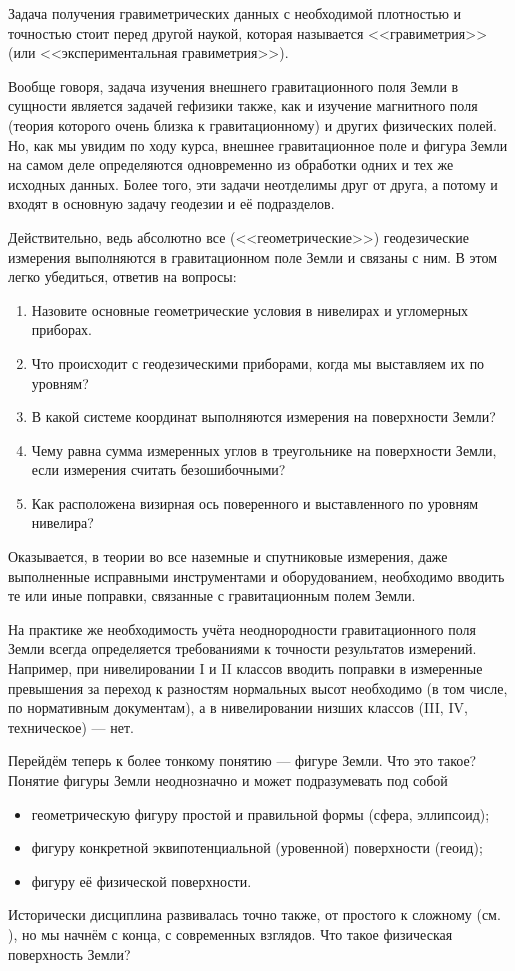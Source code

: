 \documentclass[11pt, a4paper]{article}
\theoremstyle{plain}
\theoremstyle{definition}
\theoremstyle{remark}
\begin{document}
Задача получения гравиметрических данных с необходимой плотностью и точностью стоит 
перед другой наукой, которая называется <<гравиметрия>> (или <<экспериментальная гравиметрия>>).

Вообще говоря, задача изучения внешнего гравитационного поля Земли в сущности является задачей
гефизики также, как и изучение магнитного поля (теория которого очень близка к гравитационному) 
и других физических полей. Но, как мы увидим по ходу курса, внешнее гравитационное поле и фигура
Земли на самом деле определяются одновременно из обработки одних и тех же исходных данных. Более
того, эти задачи неотделимы друг от друга, а потому и входят в основную задачу геодезии и её подразделов\cite{Pellinen1978}.

Действительно, ведь абсолютно все (<<геометрические>>) геодезические измерения выполняются в гравитационном поле 
Земли и связаны с ним. В этом легко убедиться, ответив на вопросы:
\begin{enumerate}
    \item Назовите основные геометрические условия в нивелирах и угломерных приборах.
    \item Что происходит с геодезическими приборами, когда мы выставляем их по уровням? 
    \item В какой системе координат выполняются измерения на поверхности Земли?
    \item Чему равна сумма измеренных углов в треугольнике на поверхности Земли, если измерения считать безошибочными?
    \item Как расположена визирная ось поверенного и выставленного по уровням нивелира?
\end{enumerate}
Оказывается, в теории во все наземные и спутниковые измерения, даже выполненные исправными
инструментами и оборудованием, необходимо вводить те или иные поправки, связанные с гравитационным полем Земли.

На практике же необходимость учёта неоднородности гравитационного поля Земли всегда определяется требованиями к
точности результатов измерений. Например, при нивелировании I и II классов вводить поправки в измеренные
превышения за переход к разностям нормальных высот необходимо (в том числе, по нормативным документам), а в 
нивелировании низших классов (III, IV, техническое) --- нет.

Перейдём теперь к более тонкому понятию --- фигуре Земли. Что это такое? 
Понятие фигуры Земли неоднозначно и может подразумевать под собой
\begin{itemize}
    \item геометрическую фигуру простой и правильной формы (сфера, эллипсоид);
    \item фигуру конкретной эквипотенциальной (уровенной) поверхности (геоид);
    \item фигуру её физической поверхности.
\end{itemize}
Исторически дисциплина развивалась точно также, от простого к сложному (см.
\cite{Ogorodova2013,Yuzefovich2014}), но мы начнём с конца, с современных взглядов. 
Что такое физическая поверхность Земли?
\end{document}
